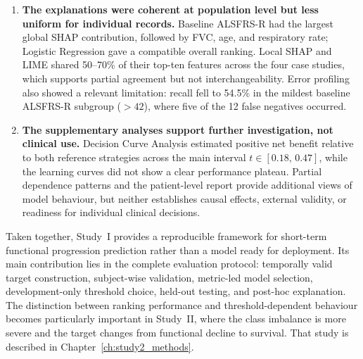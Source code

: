\begin{enumerate}
  \item \textbf{The explanations were coherent at population level but less uniform for individual records.}
    Baseline \gls{ALSFRS-R} had the largest global SHAP contribution, followed by \gls{FVC}, age, and respiratory rate; Logistic Regression gave a compatible overall ranking.
    Local SHAP and \gls{LIME} shared 50--70\% of their top-ten features across the four case studies, which supports partial agreement but not interchangeability.
    Error profiling also showed a relevant limitation: recall fell to 54.5\% in the mildest baseline \gls{ALSFRS-R} subgroup ($>42$), where five of the 12 false negatives occurred.

  \item \textbf{The supplementary analyses support further investigation, not clinical use.}
    Decision Curve Analysis estimated positive net benefit relative to both reference strategies across the main interval $t\in[0.18,\,0.47]$, while the learning curves did not show a clear performance plateau.
    Partial dependence patterns and the patient-level report provide additional views of model behaviour, but neither establishes causal effects, external validity, or readiness for individual clinical decisions.
\end{enumerate}

\bigskip
\noindent
Taken together, Study~I provides a reproducible framework for short-term functional progression prediction rather than a model ready for deployment.
Its main contribution lies in the complete evaluation protocol: temporally valid target construction, subject-wise validation, metric-led model selection, development-only threshold choice, held-out testing, and post-hoc explanation.
The distinction between ranking performance and threshold-dependent behaviour becomes particularly important in Study~II, where the class imbalance is more severe and the target changes from functional decline to survival.
That study is described in Chapter~\ref{ch:study2_methods}.
